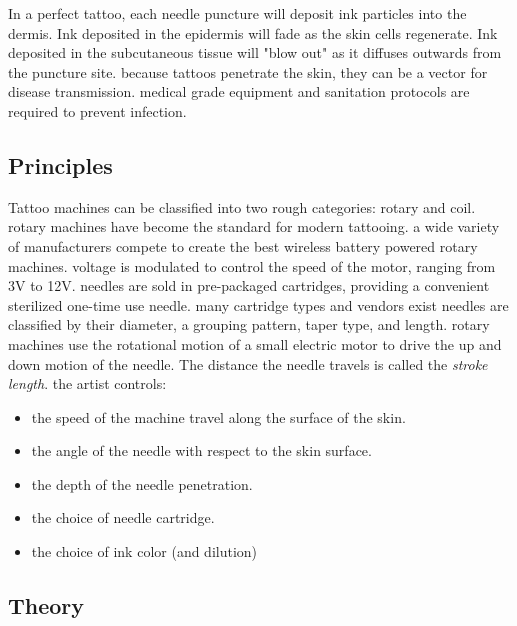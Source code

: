 \documentclass[11pt]{article}
\begin{document}
In a perfect tattoo, each needle puncture will deposit ink particles into the dermis.
Ink deposited in the epidermis will fade as the skin cells regenerate.
Ink deposited in the subcutaneous tissue will "blow out" as it diffuses outwards from the puncture site.
because tattoos penetrate the skin, they can be a vector for disease transmission.
medical grade equipment and sanitation protocols are required to prevent infection.

\subsection{Principles}

Tattoo machines can be classified into two rough categories: rotary and coil.
rotary machines have become the standard for modern tattooing.
a wide variety of manufacturers compete to create the best wireless battery powered rotary machines.
voltage is modulated to control the speed of the motor, ranging from 3V to 12V.
needles are sold in pre-packaged cartridges, providing a convenient sterilized one-time use needle.
many cartridge types and vendors exist
needles are classified by their diameter, a grouping pattern, taper type, and length.
rotary machines use the rotational motion of a small electric motor to drive the up and down motion of the needle.
The distance the needle travels is called the \textit{stroke length}.
the artist controls:
\begin{itemize}
    \item the speed of the machine travel along the surface of the skin.
    \item the angle of the needle with respect to the skin surface.
    \item the depth of the needle penetration.
    \item the choice of needle cartridge.
    \item the choice of ink color (and dilution)
\end{itemize}

\subsection{Theory}
\end{document}
